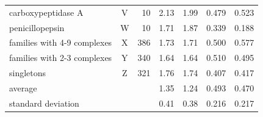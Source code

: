 \begin{table}
\begin{tabular}{lcrrrrr}
carboxypeptidase A             & V &  10 & 2.13 & 1.99 & 0.479 & 0.523\\
penicillopepsin                & W &  10 & 1.71 & 1.87 & 0.339 & 0.188\\
families with 4-9 complexes    & X & 386 & 1.73 & 1.71 & 0.500 & 0.577\\
families with 2-3 complexes    & Y & 340 & 1.64 & 1.64 & 0.510 & 0.495\\
singletons                     & Z & 321 & 1.76 & 1.74 & 0.407 & 0.417\\
average                        &   &     & 1.35 & 1.24 & 0.493 & 0.470\\
standard deviation             &   &     & 0.41 & 0.38 & 0.216 & 0.217\\
\hline
\end{tabular}
\end{table}

